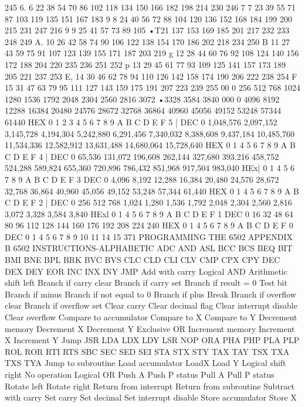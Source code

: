 {{{{{{{{{{{{{{{{{{{{{{{{{{{{{{{{{{{{{{{{{{{{{{{{{{{{{{{{{{{{{{{{{{{{{{{{{{{{{{{{{{{{{{{{{{{{{{{{{{{{{{{{{{{{{{{{{{{{{{{{{{{{{{{{{{{{{{{{{{{{245
6.
6
22
38
54
70
86
102
118
134
150
166
182
198
214
230
246
7
7
23
39
55
71
87
103
119
135
151
167
183
9
8
24
40
56
72
88
104
120
136
152
168
184
199 200
215
231
247
216
9
9
25
41
57
73
89
105
•T21
137
153
169
185
201
217
232 233
248 249
A.
10
26
42
58
74
90
106
122
138
154
170
186
202
218
234
250
B
11
27
43
59
75
91
107
123
139
155
171
187
203
219
g
12
28
44
60
76
92
108
124
140
156
172
188
204
220
235 236
251 252
p
13
29
45
61
77
93
109
125
141
157
173
189
205
221
237
253
E,
14
30
46
62
78
94
110
126
142
158
174
190
206
222
238
254
F
15
31
47
63
79
95
111
127
143
159
175
191
207
223
239
255
00
0
256
512
768
1024
1280
1536
1792
2048
2304
2560
2816
3072
•3328
3584
3840
000
0
4096
8192
12288
16384
20480
24576
28672
32768
36864
40960
45056
49152
53248
57344
61440
HEX
0
1
2
3
4
5
6
7
8
9
A
B
C
D
E
F
5
| DEC
0
1,048,576
2,097,152
3,145,728
4,194,304
5,242,880
6,291,456
7,340,032
8,388,608
9,437,184
10,485,760
11,534,336
12,582,912
13,631,488
14,680,064
15,728,640
HEX
0
1
4
5
6
7
8
9
A
B
C
D
E
F
4
| DEC
0
65,536
131,072
196,608
262,144
327,680
393.216
458,752
524,288
589,824
655,360
720,896
786,432
851,968
917,504
983,040
HEx|
0
1
4
5
6
7
8
9
A
B
C
D
E
F
3
DEC
0
4,096
8,192
12,288
16,384
20,480
24,576
28,672
32,768
36,864
40,960
45,056
49,152
53,248
57,344
61,440
HEX
0
1
4
5
6
7
8
9
A
B
C
D
E
F
2
| DEC
0
256
512
768
1,024
1,280
1,536
1,792
2,048
2,304
2,560
2,816
3,072
3,328
3,584
3,840
HExl
0
1
4
5
6
7
8
9
A
B
C
D
E
F
1
DEC
0
16
32
48
64
80
96
112
128
144
160
176
192
208
224
240
HEX
0
1
4
5
6
7
8
9
A
B
C
D
E
F
0
DEC
0
1
4
5
6
7
8
9
10
11
14
15
371
PROGRAMMING THE 6502
APPENDIX B
6502 INSTRUCTIONS-ALPHABETIC
ADC
AND
ASL
BCC
BCS
BEQ
BIT
BMI
BNE
BPL
BRK
BVC
BVS
CLC
CLD
CLI
CLV
CMP
CPX
CPY
DEC
DEX
DEY
EOR
INC
INX
INY
JMP
Add with carry
Logical AND
Arithmetic shift left
Branch if carry clear
Branch if carry set
Branch if result = 0
Test bit
Branch if minus
Branch if not equal to 0
Branch if plus
Break
Branch if overflow clear
Branch if overflow set
Clear carry
Clear decimal flag
Clear interrupt disable
Clear overflow
Compare to accumulator
Compare to X
Compare to Y
Decrement memory
Decrement X
Decrement Y
Exclusive OR
Increment memory
Increment X
Increment Y
Jump
JSR
LDA
LDX
LDY
LSR
NOP
ORA
PHA
PHP
PLA
PLP
ROL
ROR
RTI
RTS
SBC
SEC
SED
SEI
STA
STX
STY
TAX
TAY
TSX
TXA
TXS
TYA
Jump to subroutine
Load accumulator
LoadX
Load Y
Logical shift right
No operation
Logical OR
Push A
Push P status
Pull A
Pull P status
Rotate left
Rotate right
Return from interrupt
Return from subroutine
Subtract with carry
Set carry
Set decimal
Set interrupt disable
Store accumulator
Store X
}}}}}}}}}}}}}}}}}}}}}}}}}}}}}}}}}}}}}}}}}}}}}}}}}}}}}}}}}}}}}}}}}}}}}}}}}}}}}}}}}}}}}}}}}}}}}}}}}}}}}}}}}}}}}}}}}}}}}}}}}}}}}}}}}}}}}}}}}}}}
